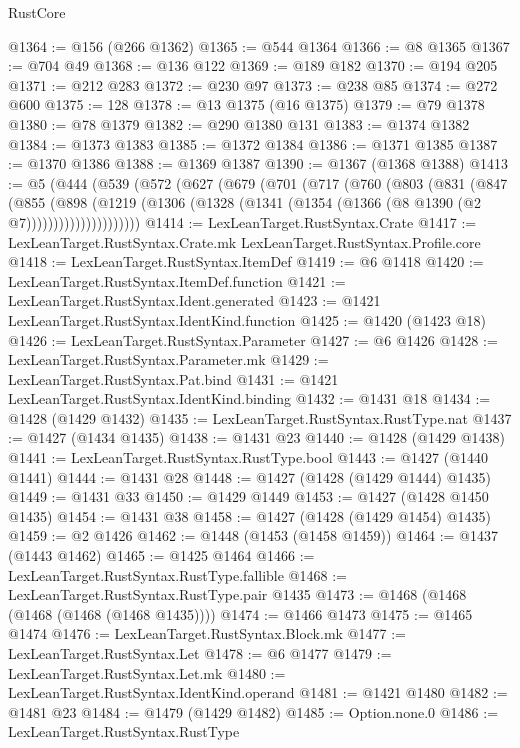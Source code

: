 \begin{lexlean}{RustCore}
\begin{coremodule}
@1364 := @156 (@266 @1362)
@1365 := @544 @1364
@1366 := @8 @1365
@1367 := @704 @49
@1368 := @136 @122
@1369 := @189 @182
@1370 := @194 @205
@1371 := @212 @283
@1372 := @230 @97
@1373 := @238 @85
@1374 := @272 @600
@1375 := 128
@1378 := @13 @1375 (@16 @1375)
@1379 := @79 @1378
@1380 := @78 @1379
@1382 := @290 @1380 @131
@1383 := @1374 @1382
@1384 := @1373 @1383
@1385 := @1372 @1384
@1386 := @1371 @1385
@1387 := @1370 @1386
@1388 := @1369 @1387
@1390 := @1367 (@1368 @1388)
@1413 := @5
    (@444
      (@539
        (@572
          (@627
            (@679
              (@701
                (@717
                  (@760
                    (@803
                      (@831
                        (@847
                          (@855
                            (@898
                              (@1219
                                (@1306
                                  (@1328 (@1341 (@1354 (@1366 (@8 @1390 (@2 @7)))))))))))))))))))))
@1414 := LexLeanTarget.RustSyntax.Crate
@1417 := LexLeanTarget.RustSyntax.Crate.mk LexLeanTarget.RustSyntax.Profile.core
@1418 := LexLeanTarget.RustSyntax.ItemDef
@1419 := @6 @1418
@1420 := LexLeanTarget.RustSyntax.ItemDef.function
@1421 := LexLeanTarget.RustSyntax.Ident.generated
@1423 := @1421 LexLeanTarget.RustSyntax.IdentKind.function
@1425 := @1420 (@1423 @18)
@1426 := LexLeanTarget.RustSyntax.Parameter
@1427 := @6 @1426
@1428 := LexLeanTarget.RustSyntax.Parameter.mk
@1429 := LexLeanTarget.RustSyntax.Pat.bind
@1431 := @1421 LexLeanTarget.RustSyntax.IdentKind.binding
@1432 := @1431 @18
@1434 := @1428 (@1429 @1432)
@1435 := LexLeanTarget.RustSyntax.RustType.nat
@1437 := @1427 (@1434 @1435)
@1438 := @1431 @23
@1440 := @1428 (@1429 @1438)
@1441 := LexLeanTarget.RustSyntax.RustType.bool
@1443 := @1427 (@1440 @1441)
@1444 := @1431 @28
@1448 := @1427 (@1428 (@1429 @1444) @1435)
@1449 := @1431 @33
@1450 := @1429 @1449
@1453 := @1427 (@1428 @1450 @1435)
@1454 := @1431 @38
@1458 := @1427 (@1428 (@1429 @1454) @1435)
@1459 := @2 @1426
@1462 := @1448 (@1453 (@1458 @1459))
@1464 := @1437 (@1443 @1462)
@1465 := @1425 @1464
@1466 := LexLeanTarget.RustSyntax.RustType.fallible
@1468 := LexLeanTarget.RustSyntax.RustType.pair @1435
@1473 := @1468 (@1468 (@1468 (@1468 (@1468 @1435))))
@1474 := @1466 @1473
@1475 := @1465 @1474
@1476 := LexLeanTarget.RustSyntax.Block.mk
@1477 := LexLeanTarget.RustSyntax.Let
@1478 := @6 @1477
@1479 := LexLeanTarget.RustSyntax.Let.mk
@1480 := LexLeanTarget.RustSyntax.IdentKind.operand
@1481 := @1421 @1480
@1482 := @1481 @23
@1484 := @1479 (@1429 @1482)
@1485 := Option.none.{0}
@1486 := LexLeanTarget.RustSyntax.RustType

\end{coremodule}
\end{lexlean}
